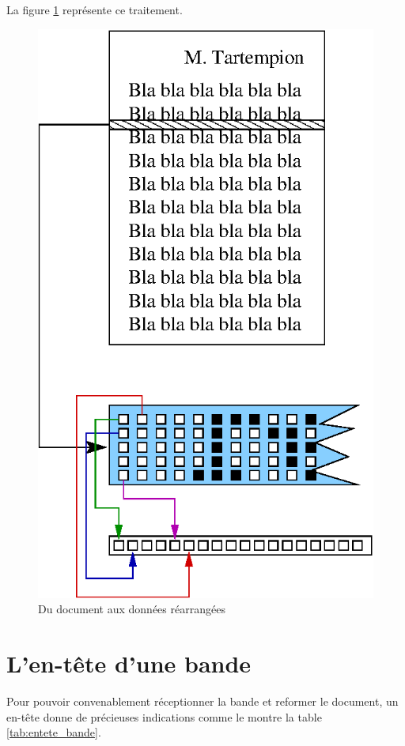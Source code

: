 La figure \ref{fig:bande} représente ce traitement.

\begin{figure}[ht]
\centering
\includegraphics{Images/bande.eps}
\caption{Du document aux données réarrangées}
\label{fig:bande}
\end{figure}


\section{L'en-tête d'une bande}

Pour pouvoir convenablement réceptionner la bande et reformer le document,
un en-tête donne de précieuses indications comme le montre la table
\ref{tab:entete_bande}.

